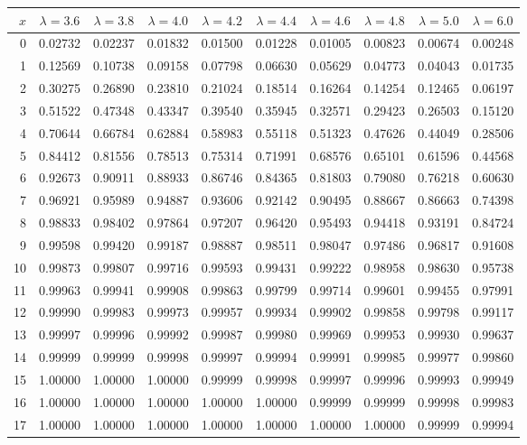 \myskip
\begin{tabular}{r|*{9}{c}}
$x$ &  $\lambda=3.6$  &  $\lambda=3.8$  &  $\lambda=4.0$  &  $\lambda=4.2$  &  $\lambda=4.4$
    &  $\lambda=4.6$  &  $\lambda=4.8$  &  $\lambda=5.0$  &  $\lambda=6.0$                    \\\hline
  0 & 0.02732 & 0.02237 & 0.01832 & 0.01500 & 0.01228 & 0.01005 & 0.00823 & 0.00674 & 0.00248 \\
  1 & 0.12569 & 0.10738 & 0.09158 & 0.07798 & 0.06630 & 0.05629 & 0.04773 & 0.04043 & 0.01735 \\
  2 & 0.30275 & 0.26890 & 0.23810 & 0.21024 & 0.18514 & 0.16264 & 0.14254 & 0.12465 & 0.06197 \\
  3 & 0.51522 & 0.47348 & 0.43347 & 0.39540 & 0.35945 & 0.32571 & 0.29423 & 0.26503 & 0.15120 \\
  4 & 0.70644 & 0.66784 & 0.62884 & 0.58983 & 0.55118 & 0.51323 & 0.47626 & 0.44049 & 0.28506 \\
  5 & 0.84412 & 0.81556 & 0.78513 & 0.75314 & 0.71991 & 0.68576 & 0.65101 & 0.61596 & 0.44568 \\
  6 & 0.92673 & 0.90911 & 0.88933 & 0.86746 & 0.84365 & 0.81803 & 0.79080 & 0.76218 & 0.60630 \\
  7 & 0.96921 & 0.95989 & 0.94887 & 0.93606 & 0.92142 & 0.90495 & 0.88667 & 0.86663 & 0.74398 \\
  8 & 0.98833 & 0.98402 & 0.97864 & 0.97207 & 0.96420 & 0.95493 & 0.94418 & 0.93191 & 0.84724 \\
  9 & 0.99598 & 0.99420 & 0.99187 & 0.98887 & 0.98511 & 0.98047 & 0.97486 & 0.96817 & 0.91608 \\
 10 & 0.99873 & 0.99807 & 0.99716 & 0.99593 & 0.99431 & 0.99222 & 0.98958 & 0.98630 & 0.95738 \\
 11 & 0.99963 & 0.99941 & 0.99908 & 0.99863 & 0.99799 & 0.99714 & 0.99601 & 0.99455 & 0.97991 \\
 12 & 0.99990 & 0.99983 & 0.99973 & 0.99957 & 0.99934 & 0.99902 & 0.99858 & 0.99798 & 0.99117 \\
 13 & 0.99997 & 0.99996 & 0.99992 & 0.99987 & 0.99980 & 0.99969 & 0.99953 & 0.99930 & 0.99637 \\
 14 & 0.99999 & 0.99999 & 0.99998 & 0.99997 & 0.99994 & 0.99991 & 0.99985 & 0.99977 & 0.99860 \\
 15 & 1.00000 & 1.00000 & 1.00000 & 0.99999 & 0.99998 & 0.99997 & 0.99996 & 0.99993 & 0.99949 \\
 16 & 1.00000 & 1.00000 & 1.00000 & 1.00000 & 1.00000 & 0.99999 & 0.99999 & 0.99998 & 0.99983 \\
 17 & 1.00000 & 1.00000 & 1.00000 & 1.00000 & 1.00000 & 1.00000 & 1.00000 & 0.99999 & 0.99994 \\
\end{tabular}

